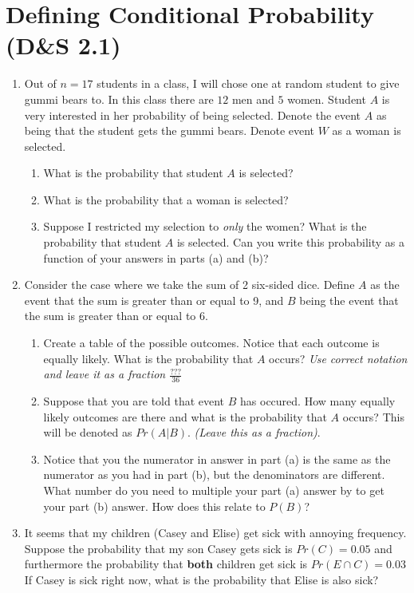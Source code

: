 \documentclass[]{book}
\providecommand{\tightlist}{%
  \setlength{\itemsep}{0pt}\setlength{\parskip}{0pt}}
\begin{document}
\section{Defining Conditional Probability (D\&S
2.1)}\label{defining-conditional-probability-ds-2.1}

\begin{enumerate}
\def\labelenumi{\arabic{enumi}.}
\tightlist
\item
  Out of \(n=17\) students in a class, I will chose one at random
  student to give gummi bears to. In this class there are \(12\) men and
  \(5\) women. Student \(A\) is very interested in her probability of
  being selected. Denote the event \(A\) as being that the student gets
  the gummi bears. Denote event \(W\) as a woman is selected.

  \begin{enumerate}
  \def\labelenumii{\alph{enumii})}
  \tightlist
  \item
    What is the probability that student \(A\) is selected?
  \item
    What is the probability that a woman is selected?
  \item
    Suppose I restricted my selection to \emph{only} the women? What is
    the probability that student \(A\) is selected. Can you write this
    probability as a function of your answers in parts (a) and (b)?
  \end{enumerate}
\item
  Consider the case where we take the sum of 2 six-sided dice. Define
  \(A\) as the event that the sum is greater than or equal to 9, and
  \(B\) being the event that the sum is greater than or equal to 6.

  \begin{enumerate}
  \def\labelenumii{\alph{enumii})}
  \tightlist
  \item
    Create a table of the possible outcomes. Notice that each outcome is
    equally likely. What is the probability that \(A\) occurs? \emph{Use
    correct notation and leave it as a fraction \(\frac{???}{36}\)}
  \item
    Suppose that you are told that event \(B\) has occured. How many
    equally likely outcomes are there and what is the probability that
    \(A\) occurs? This will be denoted as \(Pr(A|B)\). \emph{(Leave this
    as a fraction)}.
  \item
    Notice that you the numerator in answer in part (a) is the same as
    the numerator as you had in part (b), but the denominators are
    different. What number do you need to multiple your part (a) answer
    by to get your part (b) answer. How does this relate to \(P(B)\)?
  \end{enumerate}
\item
  It seems that my children (Casey and Elise) get sick with annoying
  frequency. Suppose the probability that my son Casey gets sick is
  \(Pr(C) = 0.05\) and furthermore the probability that \textbf{both}
  children get sick is \(Pr(E \cap C) = 0.03\) If Casey is sick right
  now, what is the probability that Elise is also sick?
\end{enumerate}
\end{document}
